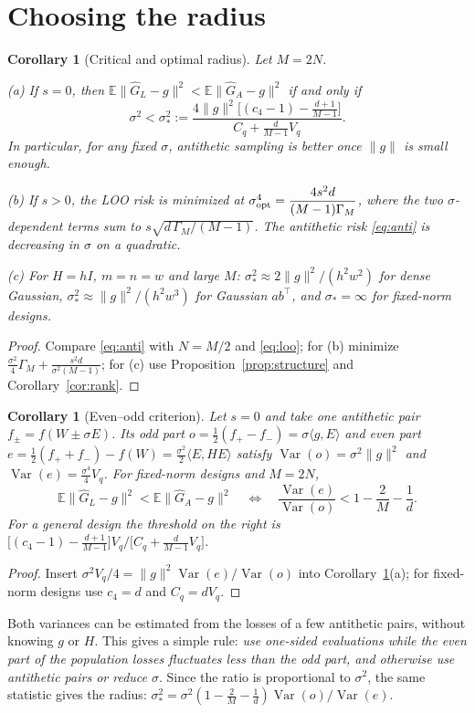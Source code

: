 \documentclass[11pt]{article}
\newtheorem{corollary}[theorem]{Corollary}
\theoremstyle{remark}
\newcommand{\E}{\mathbb{E}}
\newcommand{\ip}[2]{\langle #1,#2\rangle}
\DeclareMathOperator{\Var}{Var}
\newcommand{\Gh}{\widehat G}
\begin{document}
\section{Choosing the radius}
\begin{corollary}[Critical and optimal radius]\label{cor:sigma}
Let $M=2N$.

(a) If $s=0$, then $\E\|\Gh_L-g\|^2<\E\|\Gh_A-g\|^2$ if and only if
\[
\sigma^2<\sigma_*^2:=\frac{4\|g\|^2\big[(c_4-1)-\frac{d+1}{M-1}\big]}{C_q+\frac{d}{M-1}V_q}.
\]
In particular, for any fixed $\sigma$, antithetic sampling is better once $\|g\|$ is small enough.

(b) If $s>0$, the LOO risk is minimized at $\sigma_{\rm opt}^4=\dfrac{4s^2d}{(M-1)\Gamma_M}$, where the two $\sigma$-dependent terms sum to $s\sqrt{d\,\Gamma_M/(M-1)}$. The antithetic risk \eqref{eq:anti} is decreasing in $\sigma$ on a quadratic.

(c) For $H=hI$, $m=n=w$ and large $M$: $\sigma_*^2\approx2\|g\|^2/(h^2w^2)$ for dense Gaussian, $\sigma_*^2\approx\|g\|^2/(h^2w^3)$ for Gaussian $ab^\top$, and $\sigma_*=\infty$ for fixed-norm designs.
\end{corollary}
\begin{proof}
Compare \eqref{eq:anti} with $N=M/2$ and \eqref{eq:loo}; for (b) minimize $\frac{\sigma^2}4\Gamma_M+\frac{s^2d}{\sigma^2(M-1)}$; for (c) use Proposition~\ref{prop:structure} and Corollary~\ref{cor:rank}.
\end{proof}
\begin{corollary}[Even--odd criterion]\label{cor:evenodd}
Let $s=0$ and take one antithetic pair $f_\pm=f(W\pm\sigma E)$. Its odd part $o=\frac12(f_+-f_-)=\sigma\ip{g}{E}$ and even part $e=\frac12(f_++f_-)-f(W)=\frac{\sigma^2}2\ip{E}{HE}$ satisfy $\Var(o)=\sigma^2\|g\|^2$ and $\Var(e)=\frac{\sigma^4}4V_q$. For fixed-norm designs and $M=2N$,
\[
\E\|\Gh_L-g\|^2<\E\|\Gh_A-g\|^2\quad\Longleftrightarrow\quad\frac{\Var(e)}{\Var(o)}<1-\frac2M-\frac1d .
\]
For a general design the threshold on the right is $\big[(c_4-1)-\frac{d+1}{M-1}\big]V_q\big/\big[C_q+\frac{d}{M-1}V_q\big]$.
\end{corollary}
\begin{proof}
Insert $\sigma^2V_q/4=\|g\|^2\Var(e)/\Var(o)$ into Corollary~\ref{cor:sigma}(a); for fixed-norm designs use $c_4=d$ and $C_q=dV_q$.
\end{proof}
Both variances can be estimated from the losses of a few antithetic pairs, without knowing $g$ or $H$. This gives a simple rule: \emph{use one-sided evaluations while the even part of the population losses fluctuates less than the odd part, and otherwise use antithetic pairs or reduce $\sigma$}. Since the ratio is proportional to $\sigma^2$, the same statistic gives the radius: $\sigma_*^2=\sigma^2(1-\frac2M-\frac1d)\Var(o)/\Var(e)$.
\end{document}
